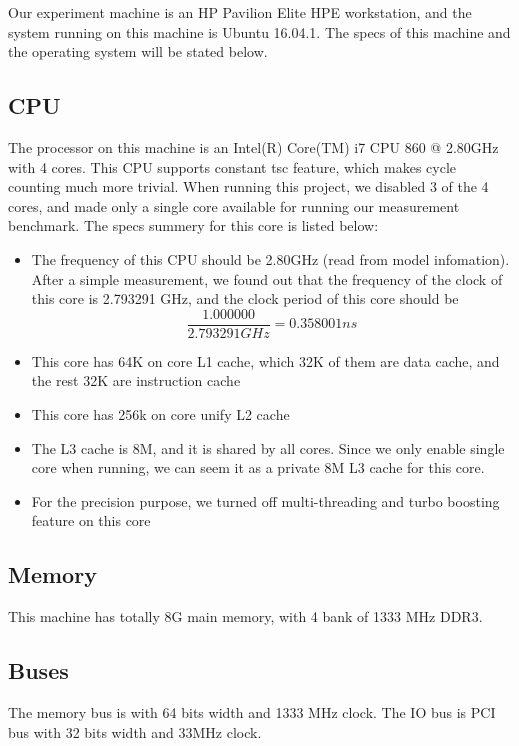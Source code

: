Our experiment machine is an HP Pavilion Elite HPE workstation, and the system running on this machine is Ubuntu 16.04.1. The specs of this machine and the operating system will be stated below.

\subsection{CPU}

The processor on this machine is an Intel(R) Core(TM) i7 CPU 860 @ 2.80GHz with 4 cores. This CPU supports constant tsc feature, which makes cycle counting much more trivial. When running this project, we disabled 3 of the 4 cores, and made only a single core available for running our measurement benchmark. The specs summery for this core is listed below:

\begin{itemize}
    \item The frequency of this CPU should be 2.80GHz (read from model infomation). After a simple measurement, we found out that the frequency of the clock of this core is 2.793291 GHz, and the clock period of this core should be $$ \frac{1.000000}{2.793291 GHz} = 0.358001 ns $$
    \item This core has 64K on core L1 cache, which 32K of them are data cache, and the rest 32K are instruction cache
    \item This core has 256k on core unify L2 cache
    \item The L3 cache is 8M, and it is shared by all cores. Since we only enable single core when running, we can seem it as a private 8M L3 cache for this core.
    \item For the precision purpose, we turned off multi-threading and turbo boosting feature on this core
\end{itemize}

\subsection{Memory}

This machine has totally 8G main memory, with 4 bank of 1333 MHz DDR3.

\subsection{Buses}

The memory bus is with 64 bits width and 1333 MHz clock. The IO bus is PCI bus with 32 bits width and 33MHz clock.

